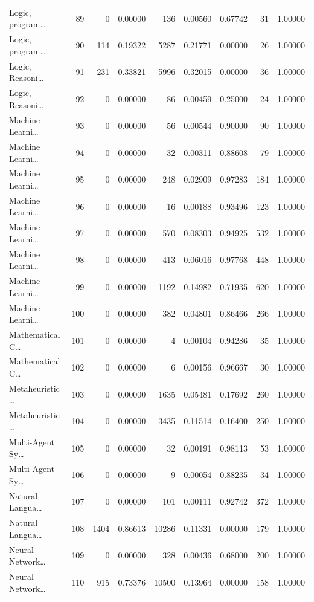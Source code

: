 \begin{table}
\begin{tabular}{lrrrrrrrr}
Logic, program… & 89 & 0 & 0.00000 & 136 & 0.00560 & 0.67742 & 31 & 1.00000 \\
Logic, program… & 90 & 114 & 0.19322 & 5287 & 0.21771 & 0.00000 & 26 & 1.00000 \\
Logic, Reasoni… & 91 & 231 & 0.33821 & 5996 & 0.32015 & 0.00000 & 36 & 1.00000 \\
Logic, Reasoni… & 92 & 0 & 0.00000 & 86 & 0.00459 & 0.25000 & 24 & 1.00000 \\
Machine Learni… & 93 & 0 & 0.00000 & 56 & 0.00544 & 0.90000 & 90 & 1.00000 \\
Machine Learni… & 94 & 0 & 0.00000 & 32 & 0.00311 & 0.88608 & 79 & 1.00000 \\
Machine Learni… & 95 & 0 & 0.00000 & 248 & 0.02909 & 0.97283 & 184 & 1.00000 \\
Machine Learni… & 96 & 0 & 0.00000 & 16 & 0.00188 & 0.93496 & 123 & 1.00000 \\
Machine Learni… & 97 & 0 & 0.00000 & 570 & 0.08303 & 0.94925 & 532 & 1.00000 \\
Machine Learni… & 98 & 0 & 0.00000 & 413 & 0.06016 & 0.97768 & 448 & 1.00000 \\
Machine Learni… & 99 & 0 & 0.00000 & 1192 & 0.14982 & 0.71935 & 620 & 1.00000 \\
Machine Learni… & 100 & 0 & 0.00000 & 382 & 0.04801 & 0.86466 & 266 & 1.00000 \\
Mathematical C… & 101 & 0 & 0.00000 & 4 & 0.00104 & 0.94286 & 35 & 1.00000 \\
Mathematical C… & 102 & 0 & 0.00000 & 6 & 0.00156 & 0.96667 & 30 & 1.00000 \\
Metaheuristic … & 103 & 0 & 0.00000 & 1635 & 0.05481 & 0.17692 & 260 & 1.00000 \\
Metaheuristic … & 104 & 0 & 0.00000 & 3435 & 0.11514 & 0.16400 & 250 & 1.00000 \\
Multi-Agent Sy… & 105 & 0 & 0.00000 & 32 & 0.00191 & 0.98113 & 53 & 1.00000 \\
Multi-Agent Sy… & 106 & 0 & 0.00000 & 9 & 0.00054 & 0.88235 & 34 & 1.00000 \\
Natural Langua… & 107 & 0 & 0.00000 & 101 & 0.00111 & 0.92742 & 372 & 1.00000 \\
Natural Langua… & 108 & 1404 & 0.86613 & 10286 & 0.11331 & 0.00000 & 179 & 1.00000 \\
Neural Network… & 109 & 0 & 0.00000 & 328 & 0.00436 & 0.68000 & 200 & 1.00000 \\
Neural Network… & 110 & 915 & 0.73376 & 10500 & 0.13964 & 0.00000 & 158 & 1.00000 \\

\end{tabular}
\end{table}
